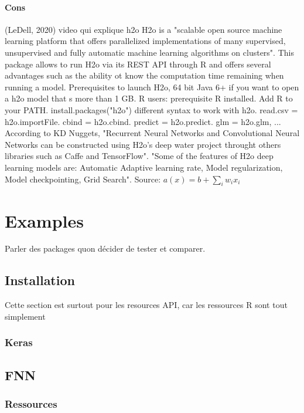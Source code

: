 \documentclass[6pt,letter]{article}\usepackage[]{graphicx}\usepackage[]{color}
\begin{document}
\paragraph{Cons}
(LeDell, 2020) video qui explique h2o 
H2o is a "scalable open source machine learning platform that offers parallelized implementations of many supervised, unsupervised and fully automatic machine learning algorithms on clusters". This package allows to run H2o via its REST API through R and offers several advantages such as the ability ot know the computation time remaining when running a model.
Prerequisites to launch H2o, 64 bit Java 6+ if you want to open a h2o model that s more than 1 GB. 
R users: prerequisite R installed. Add R to your PATH. install.packages("h2o")
different syntax to work with h2o. read.csv = h2o.importFile. cbind = h2o.cbind. predict = h2o.predict. glm = h2o.glm, ...
According to KD Nuggets, "Recurrent Neural Networks and Convolutional Neural Networks can be constructed using H2o's deep water project throught others libraries such as Caffe and TensorFlow". "Some of the features of H2o deep learning models are: Automatic Adaptive learning rate, Model regularization, Model checkpointing, Grid Search". Source: 
$a(x) = b +\sum_{i}{w_i x_i}$

\section{Examples}
\label{sec:examples}
Parler des packages quon décider de tester et comparer.
\subsection{Installation}
Cette section est surtout pour les resources API, car les ressources R sont tout simplement
\subsubsection{Keras}

\subsection{\ac{FNN}}
\subsubsection{Ressources}
\end{document}

